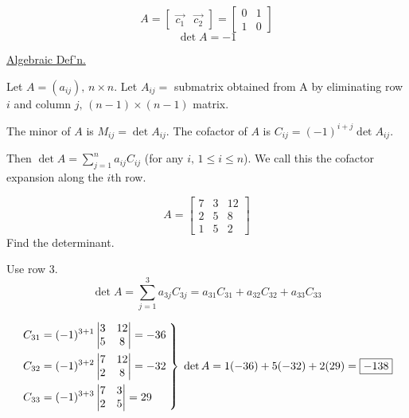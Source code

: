 \documentclass[../main.tex]{subfiles}
\begin{document}
\begin{example}[]
    \[ A = \begin{bmatrix}
        \vec{c_1} & \vec{c_2}
    \end{bmatrix} = \begin{bmatrix}
        0 & 1 \\
        1 & 0
    \end{bmatrix} \]
    \[ \det A = -1 \]

\end{example}

\underline{Algebraic Def'n.}

Let \( A = \left( a_{ij} \right), \, n \times n\).
Let \( A_{ij} = \) submatrix obtained from A by eliminating row \( i \) and column \( j, \, (n-1) \times (n-1) \) matrix.

The minor of \( A \) is \( M_{ij} = \det A_{ij}\).
The cofactor of \( A \) is \( C_{ij} = (-1)^{i+j}\det A_{ij}\).

Then \( \det A = \sum_{j=1}^{n}a_{ij}C_{ij} \) (for any \( i, \, 1 \leq i \leq n \)).
We call this the cofactor expansion along the \( i \)th row.

\begin{example}[]
    \[ A = \begin{bmatrix}
        7 & 3 & 12 \\
        2 & 5 & 8 \\
        1 & 5 & 2
    \end{bmatrix} \]
    Find the determinant.

    Use row 3.
    \[ \det A = \sum_{j=1}^{3} a_{3j} C_{3j} = a_{31}C_{31} + a_{32}C_{32} + a_{33}C_{33} \]

    \[ \left.\kern-\nulldelimiterspace
        \begin{aligned}
            C_{31} &= (-1)^{3+1} \begin{vmatrix} 3 & 12 \\ 5 & 8 \end{vmatrix} = -36 \\
            C_{32} &= (-1)^{3+2} \begin{vmatrix} 7 & 12 \\ 2 & 8 \end{vmatrix} = -32 \\
            C_{33} &= (-1)^{3+3} \begin{vmatrix} 7 & 3 \\ 2 & 5 \end{vmatrix} = 29
        \end{aligned} \; \right\} \;
        \det A = 1(-36)+5(-32)+2(29) = \boxed{-138}
    \]
\end{example}
\end{document}
